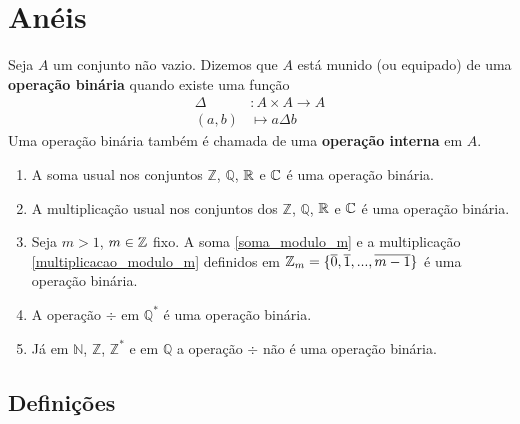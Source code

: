 \chapter{An{\'e}is}

\begin{definicao}
	Seja $A$ um conjunto n{\~a}o vazio. Dizemos que $A$ est{\'a} munido (ou equipado) de uma \textbf{opera{\c c}{\~a}o bin{\'a}ria} quando existe uma fun{\c c}{\~a}o
	\begin{align*}
		\Delta &: A \times A \to A\\
		(a,b) &\longmapsto a\Delta b		
	\end{align*}
	Uma opera{\c c}{\~a}o bin{\'a}ria tamb{\'e}m {\'e} chamada de uma \textbf{opera{\c c}{\~a}o interna} em $A$.
\end{definicao}

\begin{exemplos}
	\begin{enumerate}
		\item A soma usual nos conjuntos $\mathbb{Z}$, $\mathbb{Q}$, $\mathbb{R}$ e $\mathbb{C}$ {\'e} uma opera{\c c}{\~a}o bin{\'a}ria.

		\item A multiplicação usual nos conjuntos dos $\mathbb{Z}$, $\mathbb{Q}$, $\mathbb{R}$ e $\mathbb{C}$ {\'e} uma opera{\c c}{\~a}o bin{\'a}ria.

		\item Seja $m > 1$, $m \in \mathbb{Z}$ fixo. A soma \eqref{soma_modulo_m} e a multiplicação \eqref{multiplicacao_modulo_m} definidos em $\mathbb{Z}_m = \{\overline{0},\overline{1},...,\overline{m-1}\}$ é uma operação binária.

		\item A operação $\div$ em $\mathbb{Q}^{*}$ {\'e} uma opera{\c c}{\~a}o bin{\'a}ria.
		\item Já em $\mathbb{N}$, $\mathbb{Z}$, $\mathbb{Z}^{*}$ e em $\mathbb{Q}$ a operação $\div$ n{\~a}o {\'e} uma opera{\c c}{\~a}o bin{\'a}ria.
\end{enumerate}	
\end{exemplos}


\section{Defini{\c c}{\~o}es}

